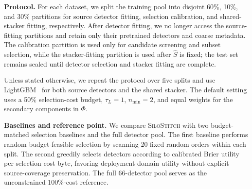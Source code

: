 \documentclass[conference]{IEEEtran}
\theoremstyle{definition}
\newcommand{\Fname}{\textsc{SiloStitch}\xspace}
\newcommand{\bheading}[1]{\noindent\textbf{#1.}\xspace}
\begin{document}
\begin{table}[t]
\centering
\caption{Scale of the four evaluation tasks. Each task uses 66 contributors and one pretrained candidate detector per contributor. Evaluated classes count labels in the sealed test set; DDoS contains one test class absent from source training.}
\label{tab:eval-datasets}
\small
{}
\end{table}

\bheading{Protocol}
For each dataset, we split the training pool into disjoint 60\%, 10\%, and 30\% partitions for source detector fitting, selection calibration, and shared-stacker fitting, respectively.
After detector fitting, we no longer access the source-fitting partitions and retain only their pretrained detectors and coarse metadata.
The calibration partition is used only for candidate screening and subset selection, while the stacker-fitting partition is used after $\widehat S$ is fixed; the test set remains sealed until detector selection and stacker fitting are complete.

Unless stated otherwise, we repeat the protocol over five splits and use LightGBM~\cite{lightgbm} for both source detectors and the shared stacker.
The default setting uses a 50\% selection-cost budget, $\tau_L=1$, $n_{\min}=2$, and equal weights for the secondary components in $\Phi$. %

\bheading{Baselines and reference point}
We compare \Fname with two budget-matched selection baselines and the full detector pool.
The first baseline performs random budget-feasible selection by scanning 20 fixed random orders within each split.
The second greedily selects detectors according to calibrated Brier utility per selection-cost byte, favoring deployment-domain utility without explicit source-coverage preservation.
The full 66-detector pool serves as the unconstrained 100\%-cost reference.
\end{document}
